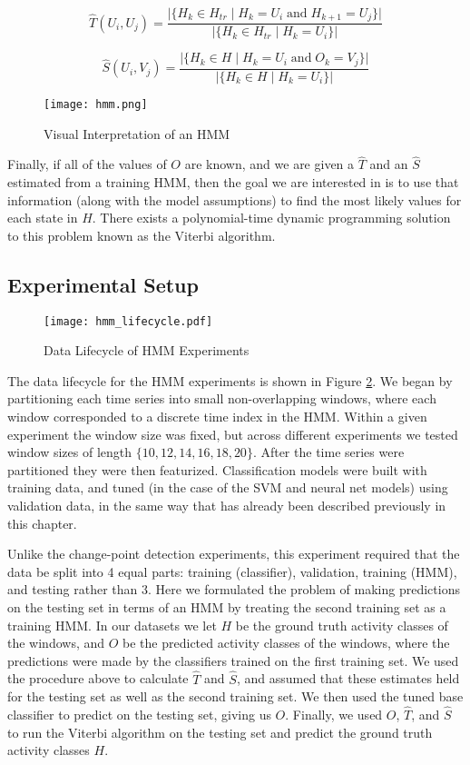 \[
\hat{T}(U_i,U_j) = \frac{|\{H_k \in H_{tr} \; | \; H_k=U_i \; \text{and} \; H_{k+1}=U_j\}|} {|\{H_k \in H_{tr} \; | \; H_k=U_i\}|}
\]

\[
\hat{S}(U_i,V_j) = \frac{|\{H_k \in H \; | \; H_k=U_i \; \text{and} \; O_k=V_j\}|} {|\{H_k \in H \; | \; H_k=U_i\}|}
\]

\begin{figure}
 \centering
 \texttt{[image: hmm.png]}
 \caption{Visual Interpretation of an HMM}
 \label{fig:hmm}
\end{figure}

Finally, if all of the values of $O$ are known, and we are given
a $\hat{T}$ and an $\hat{S}$ estimated from a training HMM, then the goal we are interested in
is to use that information (along with the model assumptions)
to find the most likely values for each state in $H$. There
exists a polynomial-time dynamic programming solution to this problem known as
the Viterbi algorithm. \cite{russell10}

\subsection{Experimental Setup}

\begin{figure}
 \centering
 \texttt{[image: hmm\_lifecycle.pdf]}
 \caption{Data Lifecycle of HMM Experiments}
 \label{fig:hmm_lifecycle}
\end{figure}

The data lifecycle for the HMM experiments is shown in Figure \ref{fig:hmm_lifecycle}.
We began by partitioning each time series into small non-overlapping windows,
where each window corresponded to a discrete time index in the HMM. Within a
given experiment the window size was fixed, but across different experiments we
tested window sizes of length $\{10, 12, 14, 16, 18, 20\}$. After the time series were
partitioned they were then featurized. Classification models were built with training data,
and tuned (in the case of the SVM and neural net models) using validation data,
in the same way that has already been described previously in this chapter.

Unlike the change-point detection experiments, this experiment required
that the data be split into 4 equal parts: training (classifier), validation,
training (HMM), and testing rather than 3. 
Here we formulated the problem of making predictions on the testing set in terms
of an HMM by treating the second training set as a training HMM. In our datasets
we let $H$ be the ground truth activity classes of the windows, and $O$ be the
predicted activity classes of the windows, where the predictions were made by
the classifiers trained on the first training set. We used the procedure above
to calculate $\hat{T}$ and $\hat{S}$, and assumed that these estimates held for
the testing set as well as the second training set. We then used the
tuned base classifier to predict on the testing set, giving us $O$. Finally,
we used $O$, $\hat{T}$, and $\hat{S}$ to run the Viterbi algorithm on the
testing set and predict the ground truth activity classes $H$.
